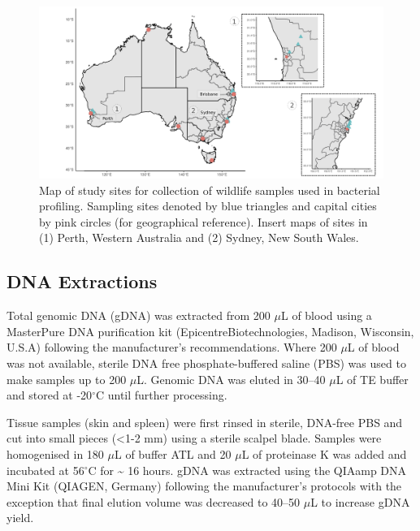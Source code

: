 \documentclass[a4paper, nobind]{templates/ociamthesis}
\begin{document}
\begin{figure}
\includegraphics[width=0.95\linewidth]{figures/ms-figs/Ch3-map} \caption[Map of study sites for wildlife samples.]{Map of study sites for collection of wildlife samples used in bacterial profiling. Sampling sites denoted by blue triangles and capital cities by pink circles (for geographical reference). Insert maps of sites in (1) Perth, Western Australia and (2) Sydney, New South Wales.}\label{fig:F3map}
\end{figure}

\hypertarget{dna-extractions}{%
\subsection{DNA Extractions}\label{dna-extractions}}

Total genomic DNA (gDNA) was extracted from 200 \(\mu\)L of blood using a MasterPure DNA purification kit (Epicentre\textregistered Biotechnologies, Madison, Wisconsin, U.S.A) following the manufacturer's recommendations. Where 200 \(\mu\)L of blood was not available, sterile DNA free phosphate-buffered saline (PBS) was used to make samples up to 200 \(\mu\)L.
Genomic DNA was eluted in 30--40 \(\mu\)L of TE buffer and stored at -20\(^\circ\)C until further processing.

Tissue samples (skin and spleen) were first rinsed in sterile, DNA-free PBS and cut into small pieces (\textless1-2 mm) using a sterile scalpel blade.
Samples were homogenised in 180 \(\mu\)L of buffer ATL and 20 \(\mu\)L of proteinase K was added and incubated at 56\(^\circ\)C for \textasciitilde{} 16 hours. gDNA was extracted using the QIAamp DNA Mini Kit (QIAGEN, Germany) following the manufacturer's protocols with the exception that final elution volume was decreased to 40--50 \(\mu\)L to increase gDNA yield.
\end{document}
